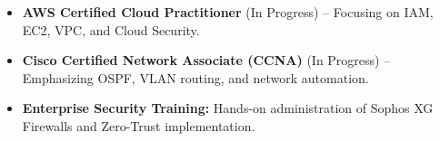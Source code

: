 \documentclass[letterpaper,10pt]{article}
\newcommand{\resumeItem}[1]{
  \item\small{#1 \vspace{-2pt}}
}
\newcommand{\resumeItemListStart}{
  \begin{itemize}[leftmargin=0.15in]
}
\newcommand{\resumeItemListEnd}{
  \end{itemize}\vspace{-5pt}
}
\begin{document}
\resumeItemListStart

    \resumeItem{\textbf{AWS Certified Cloud Practitioner} (In Progress) -- Focusing on IAM, EC2, VPC, and Cloud Security.}

    \resumeItem{\textbf{Cisco Certified Network Associate (CCNA)} (In Progress) -- Emphasizing OSPF, VLAN routing, and network automation.}

    \resumeItem{\textbf{Enterprise Security Training:} Hands-on administration of Sophos XG Firewalls and Zero-Trust implementation.}

\resumeItemListEnd
\end{document}
